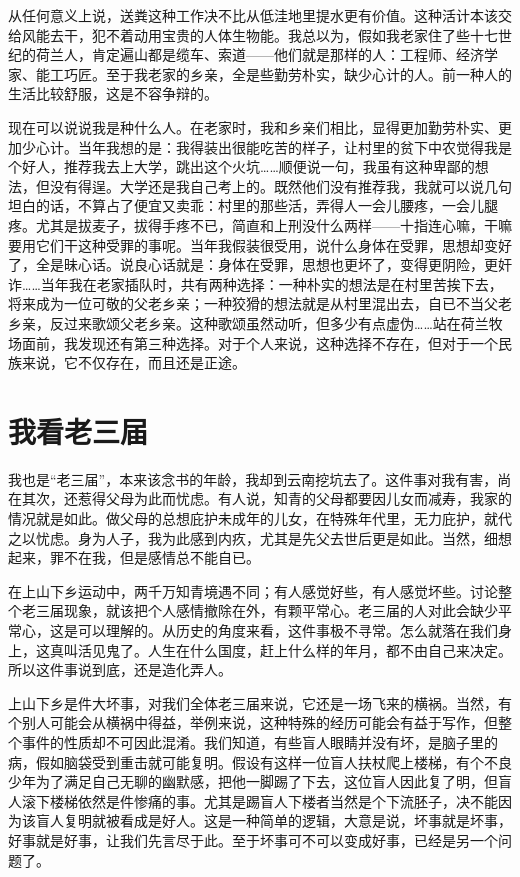 从任何意义上说，送粪这种工作决不比从低洼地里提水更有价值。这种活计本该交给风能去干，犯不着动用宝贵的人体生物能。我总以为，假如我老家住了些十七世纪的荷兰人，肯定遍山都是缆车、索道——他们就是那样的人：工程师、经济学家、能工巧匠。至于我老家的乡亲，全是些勤劳朴实，缺少心计的人。前一种人的生活比较舒服，这是不容争辩的。 

现在可以说说我是种什么人。在老家时，我和乡亲们相比，显得更加勤劳朴实、更加少心计。当年我想的是：我得装出很能吃苦的样子，让村里的贫下中农觉得我是个好人，推荐我去上大学，跳出这个火坑……顺便说一句，我虽有这种卑鄙的想法，但没有得逞。大学还是我自己考上的。既然他们没有推荐我，我就可以说几句坦白的话，不算占了便宜又卖乖：村里的那些活，弄得人一会儿腰疼，一会儿腿疼。尤其是拔麦子，拔得手疼不已，简直和上刑没什么两样——十指连心嘛，干嘛要用它们干这种受罪的事呢。当年我假装很受用，说什么身体在受罪，思想却变好了，全是昧心话。说良心话就是：身体在受罪，思想也更坏了，变得更阴险，更奸诈……当年我在老家插队时，共有两种选择：一种朴实的想法是在村里苦挨下去，将来成为一位可敬的父老乡亲；一种狡猾的想法就是从村里混出去，自已不当父老乡亲，反过来歌颂父老乡亲。这种歌颂虽然动听，但多少有点虚伪……站在荷兰牧场面前，我发现还有第三种选择。对于个人来说，这种选择不存在，但对于一个民族来说，它不仅存在，而且还是正途。

\chapter{我看老三届}

我也是“老三届”，本来该念书的年龄，我却到云南挖坑去了。这件事对我有害，尚在其次，还惹得父母为此而忧虑。有人说，知青的父母都要因儿女而减寿，我家的情况就是如此。做父母的总想庇护未成年的儿女，在特殊年代里，无力庇护，就代之以忧虑。身为人子，我为此感到内疚，尤其是先父去世后更是如此。当然，细想起来，罪不在我，但是感情总不能自已。　 

在上山下乡运动中，两千万知青境遇不同；有人感觉好些，有人感觉坏些。讨论整个老三届现象，就该把个人感情撤除在外，有颗平常心。老三届的人对此会缺少平常心，这是可以理解的。从历史的角度来看，这件事极不寻常。怎么就落在我们身上，这真叫活见鬼了。人生在什么国度，赶上什么样的年月，都不由自己来决定。所以这件事说到底，还是造化弄人。　 

上山下乡是件大坏事，对我们全体老三届来说，它还是一场飞来的横祸。当然，有个别人可能会从横祸中得益，举例来说，这种特殊的经历可能会有益于写作，但整个事件的性质却不可因此混淆。我们知道，有些盲人眼睛并没有坏，是脑子里的病，假如脑袋受到重击就可能复明。假设有这样一位盲人扶杖爬上楼梯，有个不良少年为了满足自己无聊的幽默感，把他一脚踢了下去，这位盲人因此复了明，但盲人滚下楼梯依然是件惨痛的事。尤其是踢盲人下楼者当然是个下流胚子，决不能因为该盲人复明就被看成是好人。这是一种简单的逻辑，大意是说，坏事就是坏事，好事就是好事，让我们先言尽于此。至于坏事可不可以变成好事，已经是另一个问题了。　 

